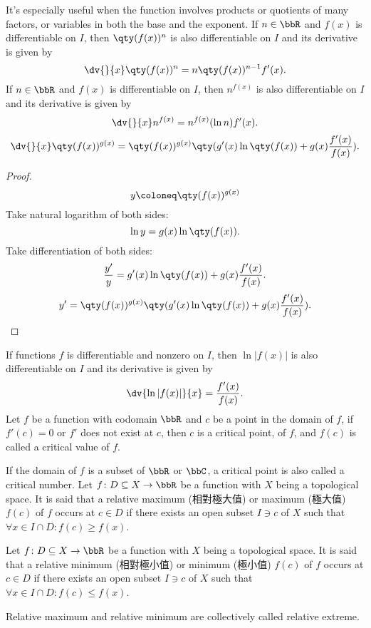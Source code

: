 \documentclass[a4paper,12pt]{report}
\begin{document}
\begin{itemize}
\begin{itemize}
It’s especially useful when the function involves products or quotients of many factors, or variables in both the base and the exponent.
If $n\in\bbR$ and $f(x)$ is differentiable on $I$, then $\qty(f(x))^n$ is also differentiable on $I$ and its derivative is given by
\[\dv{}{x}\qty(f(x))^n=n\qty(f(x))^{n-1}f'(x).\]
If $n\in\bbR$ and $f(x)$ is differentiable on $I$, then $n^{f(x)}$ is also differentiable on $I$ and its derivative is given by
\[\dv{}{x}n^{f(x)}=n^{f(x)}(\ln n)f'(x).\]
\[\dv{}{x}\qty(f(x))^{g(x)}=\qty(f(x))^{g(x)}\qty(g'(x)\ln\qty(f(x))+g(x)\frac{f'(x)}{f(x)}).\]
\begin{proof}
\[y\coloneq\qty(f(x))^{g(x)}\]
Take natural logarithm of both sides:
\[\ln y=g(x)\ln\qty(f(x)).\]
Take differentiation of both sides:
\[\frac{y'}{y}=g'(x)\ln\qty(f(x))+g(x)\frac{f'(x)}{f(x)}.\]
\[y'=\qty(f(x))^{g(x)}\qty(g'(x)\ln\qty(f(x))+g(x)\frac{f'(x)}{f(x)}).\]
\end{proof}
If functions $f$ is differentiable and nonzero on $I$, then $\ln|f(x)|$ is also differentiable on $I$ and its derivative is given by
\[\dv{\ln|f(x)|}{x}=\frac{f'(x)}{f(x)}.\]
Let $f$ be a function with codomain $\bbR$ and \( c \) be a point in the domain of $f$, if \( f'(c) = 0 \) or \( f' \) does not exist at \( c \), then \( c \) is a critical point, of \( f \), and $f(c)$ is called a critical value of $f$.

If the domain of $f$ is a subset of $\bbR$ or $\bbC$, a critical point is also called a critical number.
Let $f\colon D\subseteq X\to\bbR$ be a function with $X$ being a topological space. It is said that a relative maximum (相對極大值) or maximum (極大值) \( f(c) \) of \(f\) occurs at $c\in D$ if there exists an open subset $I\ni c$ of $X$ such that \( \forall x\in I\cap D\colon f(c) \geq f(x) \).

Let $f\colon D\subseteq X\to\bbR$ be a function with $X$ being a topological space. It is said that a relative minimum (相對極小值) or minimum (極小值) \( f(c) \) of \(f\) occurs at $c\in D$ if there exists an open subset $I\ni c$ of $X$ such that \( \forall x\in I\cap D\colon f(c) \leq f(x) \).

Relative maximum and relative minimum are collectively called relative extreme.


\end{itemize}
\end{itemize}
\end{document}
